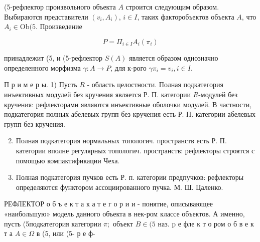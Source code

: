 \documentclass[10pt]{article}
\begin{document}
(5-рефлектор произвольного объекта $A$ строится следующим образом. Выбираются представители $\left(v_{i}, A_{i}\right)$, $i \in I$, таких факторобъектов объекта $A$, что $A_{i} \in \mathrm{Ob}(5$. Произведение



\[

P=\Pi_{i \in I} A_{i}\left(\pi_{i}\right)

\]



принадлежит (5, и (5-рефлектор $S(A)$ является образом однозначно определенного морфизма $\gamma: A \rightarrow P$, для к-рого $\gamma \pi_{i}=v_{i}, i \in I$.



П р и м е р ы. 1) Пусть $R$ - область целостности. Полная подкатегория инъективных модулей без кручения является Р. П. категории $R$-модулей без кручения: рефлекторами являются инъективные оболочки модулей. В частности, подкатегория полных абелевых групп без кручения есть Р. П. категории абелевых групп без кручения.



\begin{enumerate}

  \setcounter{enumi}{1}

  \item Полная подкатегория нормальных топологич. пространств есть Р. П. категории вполне регулярных топологич. пространств: рефлекторы строятся с помощью компактификации Чеха.



  \item Полная подкатегория пучков есть Р. п. категории предпучков: рефлекторы определяются функтором ассоциированного пучка. М. Ш. Цаленко.



\end{enumerate}



РЕФЛЕКТОР о б ъ е к т а к а т е г о р и и - понятие, описывающее «наибольшую» модель данного объекта в нек-ром классе объектов. А именно, пусть (5подкатегория категории $\mathfrak{\pi} ;$ объект $B \in(5$ наз. $\mathrm{p}$ е фле к т о ром о б в е к т а $A \in \mathbb{\Omega}$ в (5, или (5- р е ф-
\end{document}
